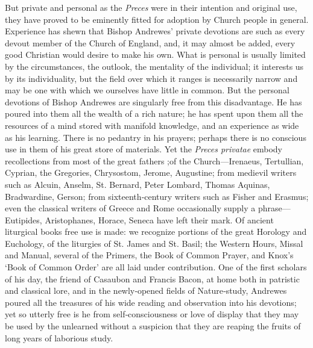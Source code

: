 But private and personal as the \emph{Preces }were in their intention and original use, they have proved to be eminently fitted for adoption by Church people in general. Experience has shewn that Bishop Andrewes’ private devotions are such as every devout member of the Church of England, and, it may almost be added, every good Christian would desire to make his own. What is personal is usually limited by the circumstances, the outlook, the mentality of the individual; it interests us by its individuality, but the field over which it ranges is necessarily narrow and may be one with which we ourselves have little in common. But the personal devotions of Bishop Andrewes are singularly free from this disadvantage. He has poured into them all the wealth of a rich nature; he has spent upon them all the resources of  a mind stored with manifold knowledge, and an experience as wide as his learning. There is no pedantry in his prayers; perhaps there is no conscious use in them of his great store of materials. Yet the \emph{Preces privatae} embody recollections from most of the great fathers ;of the Church—Irenaeus, Tertullian, Cyprian, the Gregories, Chrysostom, Jerome, Augustine; from medievil writers such as Alcuin, Anselm, St. Bernard, Peter Lombard, Thomas Aquinas, Bradwardine, Gerson; from sixteenth‑century writers such as Fisher and Erasmus; even the classical writers of Greece and Rome occasionally supply a phrase—Eutipides, Aristophanes, Horace, Seneca have left their mark. Of ancient liturgical books free use is made: we recognize portions of the great Horology and Euchology, of the liturgies of St. James and St. Basil; the Western Hours, Missal and Manual, several of the Primers, the Book of Common Prayer, and Knox’s ‘Book of Common Order’ are all laid under contribution. One of the first scholars of his day, the friend of Casaubon and Francis Bacon, at home both in patristic and classical lore, and in the newly‑opened fields of Nature‑study, Andrewes poured all the treasures of his wide reading and observation into his devotions; yet so utterly free is he from self‑consciousness or love of display that they may be used by the unlearned without a suspicion that they are reaping the fruits of long years of laborious study.

